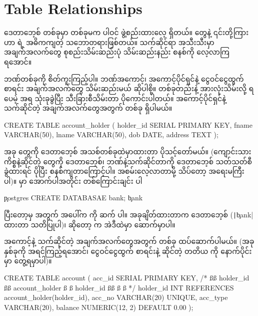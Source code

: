 \section{Table Relationships}
ဒေတာဘေ့စ် တစ်ခုမှာ  တစ်ခုမက  ပါဝင် ဖွဲ့စည်းထားလေ့ ရှိတယ်။  တွေနဲ့ ၎င်းတို့ကြား  ဟာ  ရဲ့ အဓိကကျတဲ့ သဘောတရားဖြစ်တယ်။ သက်ဆိုင်\allowbreak ရာ  အသီးသီးမှာ အချက်အလက်တွေ စုစည်းသိမ်းဆည်းပုံ သိမ်းဆည်းနည်း စနစ်ကို လေ့လာကြရအောင်။ 

ဘဏ်တစ်ခုကို စိတ်ကူးကြည့်ပါ။ ဘဏ်အကောင့်၊ အကောင့်ပိုင်ရှင်နဲ့ ငွေဝင်ငွေထွက် စာရင်း အချက်\allowbreak အလက်တွေ သိမ်းဆည်းမယ် ဆိုပါစို့။  တစ်ခုတည်းနဲ့ အားလုံးသိမ်းလို့ ရပေမဲ့  အရ  သုံးခုခွဲပြီး သီးခြားစီသိမ်းတာ ပိုကောင်းပါတယ်။  အကောင့်ပိုင်ရှင်နဲ့ သက်ဆိုင်တဲ့ အချက်အလက်တွေအတွက်  တစ်ခု ရှိပါမယ်။
%
\begin{sql}
CREATE TABLE account_holder (
    holder_id SERIAL PRIMARY KEY,
    fname VARCHAR(50),
    lname VARCHAR(50),
    dob DATE,
    address TEXT
);
\end{sql}
%
အခု  တွေကို ဒေတာဘေ့စ် အသစ်တစ်ခုထဲမှာထားတာ ပိုသင့်တော်မယ်။ (ကျောင်းသား ကိစ္စနဲ့ဆိုင်တဲ့  တွေကို  ဒေတာဘေ့စ်၊ ဘဏ်နဲ့သက်ဆိုင်တာကို  ဒေတာဘေ့စ် သတ်သတ်စီခွဲထားရင် ပိုပြီး စနစ်ကျတာကြောင့်ပါ။ အစမ်းလေ့လာတာမို့ သိပ်တော့ အရေးမကြီးပါ)။  မှာ အောက်ပါအတိုင်း တစ်ကြောင်းချင်း  ပါ
\begin{vbtm}
\c postgres
CREATE DATABASAE bank;
\c bank
\end{vbtm}
ပြီးတော့မှ   အတွက် အပေါ်က  ကို ဆက်  ပါ။ အခုချိတ်ထားတာက  ဒေတာဘေ့စ် (\texttt|\c bank|  ထားတာ သတိပြုပါ)၊ ဆိုတော့  က အဲဒီထဲမှာ ဆောက်မှာပါ။

အကောင့်နဲ့ သက်ဆိုင်တဲ့ အချက်အလက်တွေအတွက်  တစ်ခု ထပ်ဆောက်ပါမယ်။ (အခု  နှစ်ခုကို အရင်ကြည့်ရအောင်၊ ငွေဝင်ငွေထွက် စာရင်းနဲ့ ဆိုင်တဲ့ တတိယ  ကို နောက်ပိုင်းမှာ တွေ့ရမှာပါ)။ 
%
\begin{sql}
CREATE TABLE account (
    acc_id SERIAL PRIMARY KEY,
    /* ßß holder_id ßß account_holder ß ß holder_id ßß 
    ß ß */ 
    holder_id INT REFERENCES account_holder(holder_id),
    acc_no VARCHAR(20) UNIQUE,
    acc_type VARCHAR(20),
    balance NUMERIC(12, 2) DEFAULT 0.00
);
\end{sql}
%

